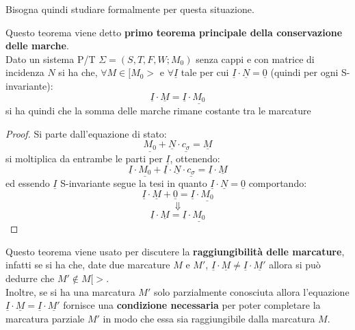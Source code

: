 \documentclass[a4paper,12pt, oneside]{book}
\begin{document}
Bisogna quindi studiare formalmente per questa situazione.
\begin{teorema}
  Questo teorema viene detto \textbf{primo teorema principale della
    conservazione delle marche}.\\ 
  Dato un sistema P/T $\Sigma=(S,T,F,W;M_0)$ senza cappi e con matrice
  di incidenza $N$ si ha che, $\forall M\in[M_0>$ e $\forall\underline{I}$ tale
  per cui $\underline{I}\cdot \underline{N}=\underline{0}$ (quindi per ogni
  S-invariante):
  \[\underline{I}\cdot \underline{M}=\underline{I}\cdot \underline{M_0}\]
  si ha quindi che la somma delle marche rimane costante tra le marcature
\end{teorema}
\begin{proof}
  Si parte dall'equazione di stato:
  \[\underline{M_0}+\underline{N}\cdot \underline{c_\sigma}=\underline{M}\]
  si moltiplica da entrambe le parti per $\underline{I}$, ottenendo:
  \[\underline{I}\cdot\underline{M_0}+\underline{I}\cdot\underline{N}\cdot
    \underline{c_\sigma}=\underline{I}\cdot\underline{M}\]
  ed essendo $\underline{I}$ S-invariante segue la tesi in quanto
  $\underline{I}\cdot \underline{N}=\underline{0}$ comportando:
  \[\underline{I}\cdot \underline{M}+\underline{0}=\underline{I}\cdot
    \underline{M_0}\] 
  \[\Downarrow\]
  \[\underline{I}\cdot \underline{M}=\underline{I}\cdot \underline{M_0}\]  
\end{proof}
Questo teorema viene usato per discutere la \textbf{raggiungibilità delle
  marcature}, infatti se si ha che, date due marcature $M$ e $M'$,
$\underline{I}\cdot \underline{M}\neq\underline{I}\cdot \underline{M'}$ allora
si può dedurre che $M'\not\in M[>$.\\
Inoltre, se si ha una marcatura $M'$ solo parzialmente conosciuta allora
l'equazione $\underline{I}\cdot \underline{M}=\underline{I}\cdot \underline{M'}$
fornisce una \textbf{condizione necessaria} per poter completare la marcatura
parziale $M'$ in modo che essa sia raggiungibile dalla marcatura $M$.\\
\end{document}
